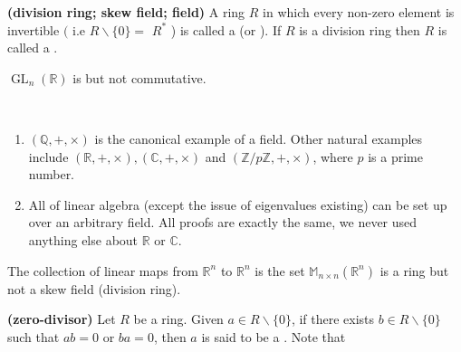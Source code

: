 \documentclass{article}
\newcommand{\bfs}[1]{\textbf{({#1}) }}
\newcommand{\GL}{\operatorname{GL}}
\begin{document}
\begin{defa}\bfs{{division ring}; skew field; field}
  A  ring $R$ in which every non-zero element is invertible $($ i.e $R \backslash\{0\}=$ $R^{*}$ ) is called a  (or ). If $R$ is a  division ring then $R$ is called a .
\end{defa} 
\begin{exma}
  $\GL_{n}(\mathbb{R})$ is  but not commutative.
\end{exma}
\begin{rema}$\quad$

\begin{enumerate}
    \item $(\mathbb{Q},+, \times)$ is the canonical example of a field. Other natural examples include $(\mathbb{R},+, \times),(\mathbb{C},+, \times)$ and $(\mathbb{Z} / p \mathbb{Z},+, \times)$, where $p$ is a prime number. 
    \item All of linear algebra (except the issue of eigenvalues existing) can be set up over an arbitrary field. All proofs are exactly the same, we never used anything else about $\mathbb{R}$ or $\mathbb{C} .$
\end{enumerate}
\end{rema}

\begin{exma}
  
  The collection of linear maps from $\mathbb{R}^{n}$ to $\mathbb{R}^{n}$ is the set $\mathbb{M}_{n \times n}\left(\mathbb{R}^{n}\right)$ is a ring but not a skew field (division ring).
\end{exma}


\begin{defa}\bfs{zero-divisor}
  Let $R$ be a  ring. Given $a \in R \backslash\{0\}$, if there exists $b \in R \backslash\{0\}$ such that $a b=0$ or $b a=0$, then $a$ is said to be a . Note that 
\end{defa}
\end{document}
